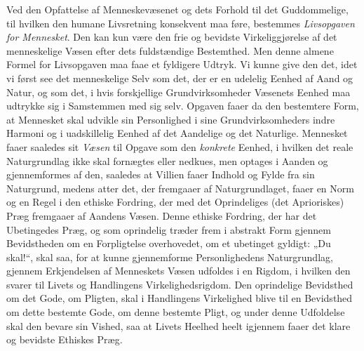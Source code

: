 \documentclass[12pt,a4paper,openany]{book}
\newcommand{\opage}[1]{\marginnote{\footnotesize\textit{[#1]}}}
\begin{document}
Ved den Opfattelse af Menneskevæsenet og dets Forhold
til det Guddommelige, til hvilken den humane Livsretning
konsekvent maa føre, bestemmes \emph{Livsopgaven for Mennesket}.
Den kan kun være den frie og bevidste Virkeliggjørelse
af det menneskelige Væsen efter dets fuldstændige Bestemthed.
Men denne almene Formel for Livsopgaven maa faae et
fyldigere Udtryk. Vi kunne give den det, idet vi først
see det menneskelige Selv som det, der er en udelelig Eenhed
af Aand og Natur, og som det, i hvis forskjellige Grundvirksomheder
Væsenets Eenhed maa udtrykke sig i Samstemmen
med sig selv. Opgaven faaer da den bestemtere Form, at
Mennesket skal udvikle sin Personlighed i sine Grundvirksomheders
indre Harmoni og i uadskillelig Eenhed af det Aandelige
og det Naturlige. Mennesket faaer saaledes sit \emph{Væsen} til
\opage{503}Opgave som den \emph{konkrete} Eenhed, i hvilken det reale
Naturgrundlag ikke skal fornægtes eller nedkues, men optages
i Aanden og gjennemformes af den, saaledes at Villien faaer
Indhold og Fylde fra sin Naturgrund, medens atter det,
der fremgaaer af Naturgrundlaget, faaer en Norm og en
Regel i den ethiske Fordring, der med det Oprindeliges (det
Aprioriskes) Præg fremgaaer af Aandens Væsen. Denne
ethiske Fordring, der har det Ubetingedes Præg, og som oprindelig
træder frem i abstrakt Form gjennem Bevidstheden
om en Forpligtelse overhovedet, om et ubetinget gyldigt:
„Du skal!“, skal saa, for at kunne gjennemforme Personlighedens
Naturgrundlag, gjennem Erkjendelsen af Menneskets
Væsen udfoldes i en Rigdom, i hvilken den svarer til Livets
og Handlingens Virkelighedsrigdom. Den oprindelige Bevidsthed
om det Gode, om Pligten, skal i Handlingens
Virkelighed blive til en Bevidsthed om dette bestemte Gode,
om denne bestemte Pligt, og under denne Udfoldelse skal den
bevare sin Vished, saa at Livets Heelhed heelt igjennem faaer
det klare og bevidste Ethiskes Præg.
\end{document}
